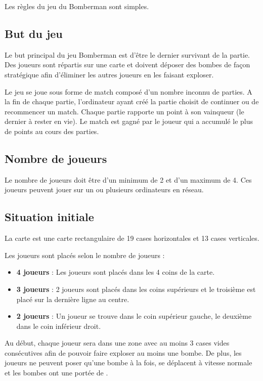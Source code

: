 Les règles du jeu du Bomberman sont simples.

\subsection{But du jeu}

Le but principal du jeu Bomberman est d'être le dernier survivant de la partie. Des joueurs sont répartis sur une carte et doivent déposer des bombes de façon stratégique afin d'éliminer les autres joueurs en les faisant exploser.

Le jeu se joue sous forme de match composé d'un nombre inconnu de parties. A la fin de chaque partie, l'ordinateur ayant créé la partie choisit de continuer ou de recommencer un match. Chaque partie rapporte un point à son vainqueur (le dernier à rester en vie). Le match est gagné par le joueur qui a accumulé le plus de points au cours des parties.

\subsection{Nombre de joueurs}

Le nombre de joueurs doit être d'un minimum de 2 et d'un maximum de 4. Ces joueurs peuvent jouer sur un ou plusieurs ordinateurs en réseau.

\subsection{Situation initiale}

La carte est une carte rectangulaire de 19 cases horizontales et 13 cases verticales.

Les joueurs sont placés selon le nombre de joueurs : 
\begin{itemize}
\item \textbf{4 joueurs} : Les joueurs sont placés dans les 4 coins de la carte.
\item \textbf{3 joueurs} : 2 joueurs sont placés dans les coins supérieurs et le troisième est placé sur la dernière ligne au centre.
\item \textbf{2 joueurs} : Un joueur se trouve dans le coin supérieur gauche, le deuxième dans le coin inférieur droit.
\end{itemize}

Au début, chaque joueur sera dans une zone avec au moins 3 cases vides consécutives afin de pouvoir faire exploser au moins une bombe. De plus, les joueurs ne peuvent poser qu'une bombe à la fois, se déplacent à vitesse normale et les bombes ont une portée de \porteeParDefaut .

